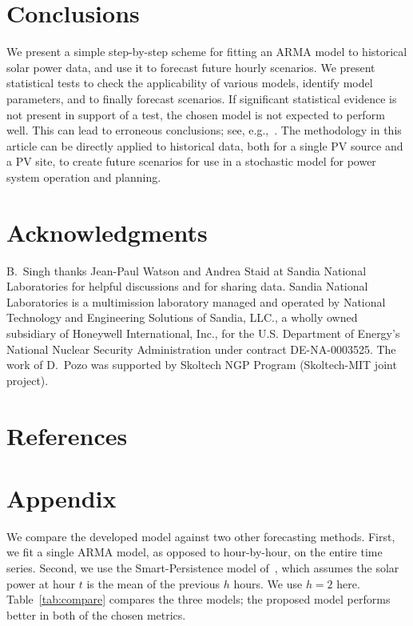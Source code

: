 \documentclass[review]{elsarticle}
\begin{document}
\section{Conclusions}
We present a simple step-by-step scheme for fitting an ARMA model to 
historical solar power data, and use it to forecast future hourly scenarios. 
We present statistical tests to check the applicability of various models, 
identify model parameters, and to finally forecast scenarios. If significant 
statistical evidence is not present in support of a 
test, the chosen model is not expected to perform well. This can lead to 
erroneous conclusions; see, 
e.g.,~\cite{kwiatkowski1992testing,phillips1988testing}.
The methodology in this article can be directly applied to historical data, 
both for a single PV source and a PV site,
to create future scenarios for use in a stochastic model for power system 
operation and planning.




\section*{Acknowledgments} 
B.\ Singh thanks Jean-Paul Watson and Andrea Staid at Sandia National 
Laboratories for helpful discussions and for sharing data. 
Sandia National Laboratories is a multimission laboratory managed and operated 
by National Technology and Engineering Solutions of Sandia, LLC., a wholly owned
subsidiary of Honeywell International, Inc., for the U.S. Department of 
Energy's 
National Nuclear Security Administration under contract DE-NA-0003525.
The work of D.\ Pozo was supported by Skoltech NGP Program (Skoltech-MIT joint 
project).

\section*{References}



\section*{Appendix} \label{sec:appendix}

We compare the developed model against two other forecasting methods. First, we 
fit a single ARMA model, as opposed to hour-by-hour, on the entire time series. 
Second, we use the Smart-Persistence model of~\cite{lauret2016solar}, which 
assumes the solar power at hour $t$ is the mean of the previous $h$ hours. We 
use $h=2$ here.
Table~\ref{tab:compare} compares the three models; the proposed model performs 
better in both of the chosen metrics. 
\end{document}
